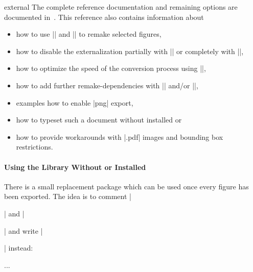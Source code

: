 {\begin{pgfplotslibrary}{external}
    The complete reference documentation and remaining options are documented
    in~\cite[``Externalization Library'']{tikz}. This reference also contains
    information about
    \begin{itemize}
        \item how to use
            || and
            || to remake
            selected figures,
        \item how to disable the externalization partially with
            || or
            completely with |\tikzexternaldisable|,
        \item how to optimize the speed of the conversion process using
            |\tikzset{external/optimize command away=\myExpensiveMacro}|,
        \item how to add further remake-dependencies with
            |\tikzpicturedependsonfile| and/or
            |\tikzexternalfiledependsonfile|,
        \item examples how to enable |png| export,
        \item how to typeset such a document without \pgfname{} installed or
        \item how to provide workarounds with |.pdf| images and bounding box
            restrictions. 
    \end{itemize}


    \paragraph{Using the Library Without {\normalfont\pgfname} or {\normalfont\PGFPlots} Installed}

    There is a small replacement package 
    which can be used once every figure has been exported. The idea is to
    comment |\usepackage{tikz}| and |\usepackage{pgfplots}| and write
    |\usepackage{tikzexternal}| instead:
\begin{codeexample}
\usepackage{tikzexternal}
    \tikzexternalize%

...


\end{codeexample}
\end{pgfplotslibrary}}
